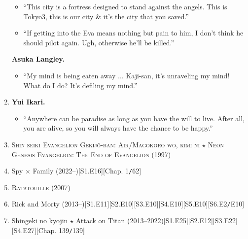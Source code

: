\documentclass{article}
\numberwithin{equation}{section}
\begin{document}
\begin{enumerate}
\begin{itemize}
		\item ``This city is a fortress designed to stand against the angels. This is Tokyo3, this is our city \& it's the city that you saved.''
		\item ``If getting into the Eva means nothing but pain to him, I don't think he should pilot again. Ugh, otherwise he'll be killed.''
	\end{itemize}
	\textbf{Asuka Langley.}
	\begin{itemize}
		\item ``My mind is being eaten away $\ldots$ Kaji-san, it's unraveling my mind! What do I do? It's defiling my mind.''
	\end{itemize}
	\item \textbf{Yui Ikari.}
	\begin{itemize}
		\item ``Anywhere can be paradise as long as you have the will to live. After all, you are alive, so you will always have the chance to be happy.''
	\end{itemize}
    \item \textsc{Shin seiki Evangelion Gekijô-ban: Air/Magokoro wo, kimi ni $\star$ Neon Genesis Evangelion: The End of Evangelion} (1997)
    \item Spy $\times$ Family (2022--)\hfill[S1.E16][Chap. 1\texttt{/}62]
    \item \textsc{Ratatouille} (2007)
    \item Rick and Morty (2013--)\hfill[S1.E11][S2.E10][S3.E10][S4.E10][S5.E10][S6.E2\texttt{/}E10]
    \item Shingeki no kyojin $\star$ Attack on Titan (2013--2022)\hfill[S1.E25][S2.E12][S3.E22][S4.E27][Chap. 139\texttt{/}139]
    

\end{enumerate}
\end{document}
